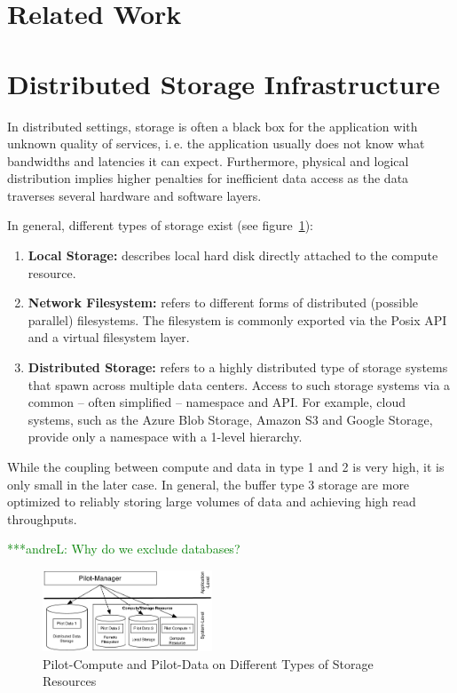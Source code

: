 \documentclass[times]{cpeauth}
\newcommand{\alnote}[1]{ {\textcolor{green} { ***andreL: #1 }}}
\newcommand{\alnote}[1]{}
\begin{document}
\section{Related Work}


\section{Distributed Storage Infrastructure}

In distributed settings, storage is often a black box for the application with
unknown quality of services, i.\,e. the application usually does not know what
bandwidths and latencies it can expect. Furthermore, physical and logical
distribution implies higher penalties for inefficient data access as the data
traverses several hardware and software layers.


In general, different types of storage exist (see 
figure~\ref{fig:figures_storage-types}):

\begin{enumerate}
	\item \textbf{Local Storage:} describes local hard disk directly attached 
	to the compute resource.
	\item \textbf{Network Filesystem:} refers to different forms of 
	distributed (possible parallel) filesystems. The filesystem is commonly 
	exported via the Posix API and a virtual filesystem layer.
	\item \textbf{Distributed Storage:} refers to a highly distributed type of 
	storage systems that spawn across multiple data centers. Access to such 
	storage systems via a common -- often simplified -- namespace and API. For 
	example, cloud systems, such as the Azure Blob Storage, Amazon S3 and 
	Google Storage, provide only a namespace with a 1-level hierarchy. 
\end{enumerate}

While the coupling between compute and data in type 1 and 2 is very high, it 
is only small in the later case. In general, the buffer type 3 storage are 
more optimized to reliably storing large volumes of data and achieving high
read throughputs.

\alnote{Why do we exclude databases?}

\begin{figure}[t]
	\centering
		\includegraphics[width=0.45\textwidth]{figures/storage-types.pdf}
	\caption{Pilot-Compute and Pilot-Data on Different Types of Storage Resources}
	\label{fig:figures_storage-types}
\end{figure}
\end{document}
